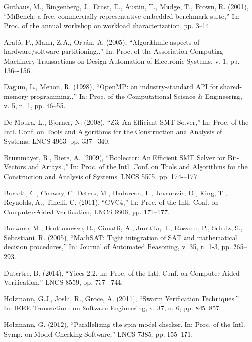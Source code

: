 \begin{thebibliography}{5}
Guthaus, M., Ringenberg, J., Ernst, D., Austin, T., Mudge, T., Brown, R. (2001), ``{MiBench: a free, commercially representative embedded benchmark suite},'' In: Proc. of the annual workshop on workload characterization, pp. 3--14.

Arat\'o, P., Mann, Z.A., Orb\'an, A. (2005), ``{Algorithmic aspects of hardware/software partitioning.},'' In: Proc. of the Association Computing Machinery Transactions on Design Automation of Electronic Systems, v. 1, pp. 136–-156.

Dagum, L., Menon, R. (1998), ``{OpenMP: an industry-standard API for shared-memory programming.},'' In: Proc. of the Computational Science \& Engineering, v. 5, n. 1, pp. 46--55.

De Moura, L., Bjorner, N. (2008), ``{Z3: An Efficient SMT Solver},'' In: Proc. of the Intl. Conf. on Tools and Algorithms for the Construction and Analysis of Systems, LNCS 4963, pp. 337–-340.

Brummayer, R., Biere, A. (2009), ``{Boolector: An Efficient SMT Solver for Bit-Vectors and Arrays.},'' In: Proc. of the Intl. Conf. on Tools and Algorithms for the Construction and Analysis of Systems, LNCS 5505, pp. 174-–177.

Barrett, C., Conway, C. Deters, M., Hadarean, L., Jovanovic, D., King, T., Reynolds, A., Tinelli, C. (2011), ``{CVC4},'' In: Proc. of the Intl. Conf. on Computer-Aided Verification, LNCS 6806, pp. 171--177.

Bozzano, M., Bruttomesso, R., Cimatti, A., Junttila, T., Rossum, P., Schulz, S., Sebastiani, R. (2005), ``{MathSAT: Tight integration of SAT and mathematical decision procedures},'' In: Journal of Automated Reasoning, v. 35, n. 1-3, pp. 265--293.

Dutertre, B. (2014), ``{Yices 2.2. In: Proc. of the Intl. Conf. on Computer-Aided Verification},'' LNCS 8559, pp. 737–-744.

Holzmann, G.J., Joshi, R., Groce, A. (2011), ``{Swarm Verification Techniques},'' In: IEEE Transactions on Software Engineering, v. 37, n. 6, pp. 845--857.

Holzmann, G. (2012), ``{Parallelizing the spin model checker. In: Proc. of the Intl. Symp. on Model Checking Software},'' LNCS 7385, pp. 155--171.


\end{thebibliography}
